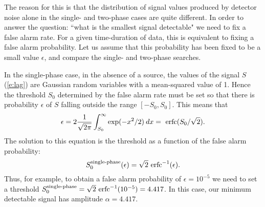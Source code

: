 The reason for this is that the distribution of signal values produced
by detector noise alone in the single- and two-phase cases are quite
different.  In order to answer the question: ``what is the smallest
signal detectable" we need to fix a false alarm rate.  For a given
time-duration of data, this is equivalent to fixing a false alarm
probability.  Let us assume that this probability has been fixed to be
a small value $\epsilon$, and compare the single- and two-phase searches.

In the single-phase case, in the absence of a source, the values of
the signal $S$ (\ref{e:lag}) are Gaussian random variables with a
mean-squared value of 1.  Hence the threshold $S_0$ determined by the
false alarm rate must be set so that there is probability $\epsilon$
of $S$ falling outside the range $[-S_0,S_0]$.  This means that
\begin{equation} \epsilon = 2 {1 \over
\sqrt{2 \pi}} \int_{S_0}^\infty \exp(-x^2/2) \> dx = {\rm \ erfc} (S_0/\sqrt{2}) .
\end{equation}
The solution to this equation is the threshold as a function of the false alarm
probability:
\begin{equation}
S_0^{\small \textrm{single-phase}}(\epsilon)=\sqrt{2}
{\rm \ erfc}^{-1}(\epsilon).
\end{equation}
Thus, for example, to obtain a false alarm probability of $\epsilon =
10^{-5}$ we need to set a threshold $S^{\small \textrm{single-phase}}_0
= \sqrt{2} \textrm{\ erfc}^{-1}(10^{-5}) = 4.417$.  In this case, our
minimum detectable signal has amplitude $\alpha = 4.417$.

